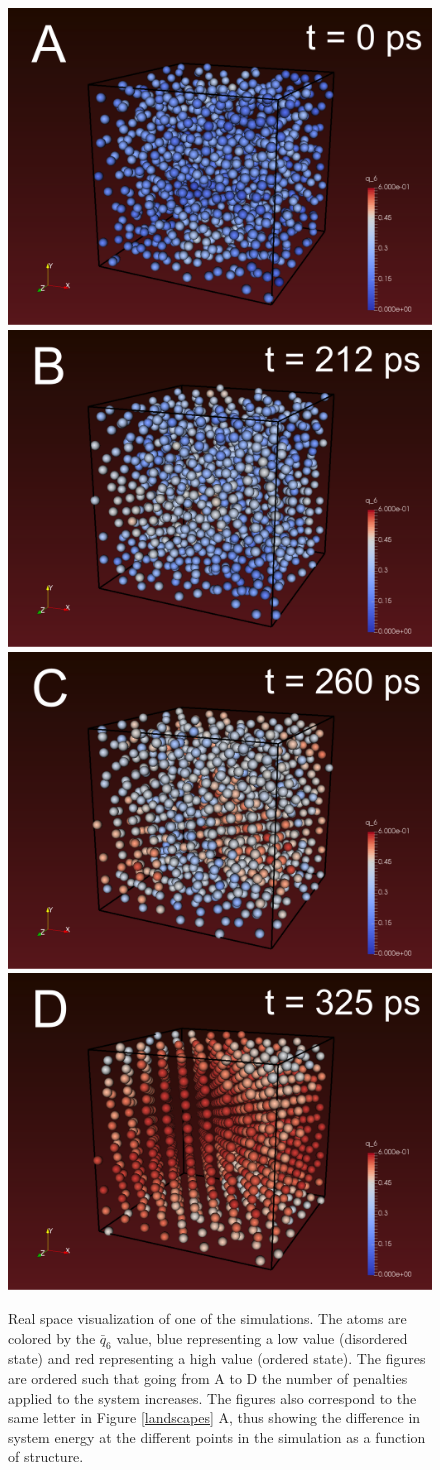 \begin{figure}[h]
	\centering
	\includegraphics[width = .45\textwidth]{./Figures/Nucleation/mtd_amorphous.png}
	\hspace{.03\textwidth}
	\includegraphics[width = .45\textwidth]{./Figures/Nucleation/mtd_prenucleation.png}
	\vspace{5mm}
	\\
	\includegraphics[width = .45\textwidth]{./Figures/Nucleation/mtd_nucleation.png}
	\hspace{.03\textwidth}
	\includegraphics[width = .45\textwidth]{./Figures/Nucleation/mtd_crystal.png}
	\caption{Real space visualization of one of the simulations.  The atoms are colored by the $\bar{q}_6$ value, blue representing a low value (disordered state) and red representing a high value (ordered state).  The figures are ordered such that going from A to D the number of penalties applied to the system increases.  The figures also correspond to the same letter in Figure \ref{landscapes} A, thus showing the difference in system energy at the different points in the simulation as a function of structure.}
	\label{simulation}
\end{figure}

